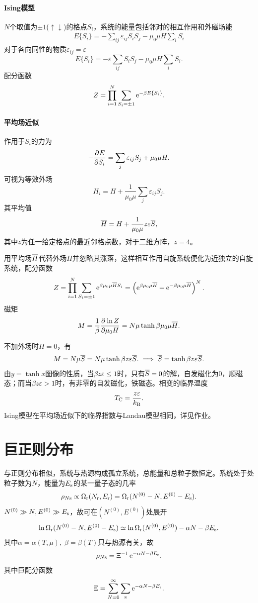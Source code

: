 \paragraph{Ising模型}$N$个取值为$\pm 1$($\uparrow\downarrow$)的格点$S_i$，系统的能量包括邻对的相互作用和外磁场能
\begin{align}
	E\{S_i\}=-\sum_{ij}\varepsilon_{ij}S_iS_j-\mu_0\mu H\sum_iS_i
\end{align}
对于各向同性的物质$\varepsilon_{ij}=\varepsilon$
\[
	E\{S_i\}=-\varepsilon\sum_{ij}S_iS_j-\mu_0\mu H\sum_iS_i.
\]
配分函数
\[
	Z=\prod_{i=1}^N\sum_{S_i=\pm 1}\mathop{}\!\mathrm{e}^{-\beta E\{S_i\}}.\]
\paragraph{平均场近似}作用于$S_i$的力为 
\[
	-\frac{\partial^{{}}E}{\partial{S_i}^{{}}}=\sum_j\varepsilon_{ij}S_j+\mu_0\mu H.
\]
可视为等效外场
\[
	H_i=H+\frac1{\mu_0\mu}\sum_j\varepsilon_{ij}S_j.
\]
其平均值
\[
	\overline{H}=H+\frac1{\mu_0\mu}z\varepsilon\overline{S},
\]
其中$z$为任一给定格点的最近邻格点数，对于二维方阵，$z=4$。

用平均场$\overline{H}$代替外场$H$并忽略其涨落，这样相互作用自旋系统便化为近独立的自旋系统，配分函数
\[
	Z=\prod_{i=1}^N\sum_{S_i=\pm 1}\mathop{}\!\mathrm{e}^{\beta\mu_0\mu\overline{H} S_i}=\left(\mathop{}\!\mathrm{e}^{\beta\mu_0\mu\overline{H}}+\mathop{}\!\mathrm{e}^{-\beta\mu_0\mu\overline{H}}\right)^N.
\]
磁矩
\begin{align}
	M=\frac1\beta\frac{\partial^{{}}\ln Z}{\partial{\mu_0 H}^{{}}}=N\mu\tanh\beta\mu_0\mu\overline{H}.
\end{align}

不加外场时$H=0$，有
\begin{align}
	M=N\mu\overline{S}=N\mu\tanh\beta z\varepsilon\overline{S}.\implies\overline{S}=\tanh\beta z\varepsilon\overline{S}.
\end{align}
由$y=\tanh x$图像的性质，当$\beta z\varepsilon\leqslant 1$时，只有$\overline{S}=0$的解，自发磁化为0，顺磁态；而当$\beta z\varepsilon>1$时，有非零的自发磁化，铁磁态。相变的临界温度
\begin{align}
	T_\mathrm C=\frac{z\varepsilon}{k_{\mathrm B}}.
\end{align}
Ising模型在平均场近似下的临界指数与Landau模型相同，详见作业。
\section{巨正则分布}

与正则分布相似，系统与热源构成孤立系统，总能量和总粒子数恒定。系统处于处粒子数为$N$，能量为$E_\mathrm s$的某一量子态的几率
\[
	\rho_{N\mathrm s}\propto\Omega_\mathrm r(N_\mathrm r,E_\mathrm r)=\Omega_\mathrm r(N^{(0)}-N,E^{(0)}-E_\mathrm s).
\]
$N^{(0)}\gg N,E^{(0)}\gg E_\mathrm s$，故可在$(N^{(0)},E^{(0)})$处展开
\[
	\ln\Omega_\mathrm r(N^{(0)}-N,E^{(0)}-E_\mathrm s)\simeq\ln\Omega_\mathrm r(N^{(0)},E^{(0)})-\alpha N-\beta E_\mathrm s.
\]
其中$\alpha=\alpha(T,\mu),\;\beta=\beta(T)$只与热源有关，故
\begin{align}
	\rho_{N\mathrm s}=\Xi^{-1}\mathop{}\!\mathrm{e}^{-\alpha N-\beta E_\mathrm s}.
\end{align}
其中巨配分函数
\begin{align}
	\Xi=\sum_{N=0}^\infty\sum_\mathrm s\mathop{}\!\mathrm{e}^{-\alpha N-\beta E_\mathrm s}.
\end{align}
